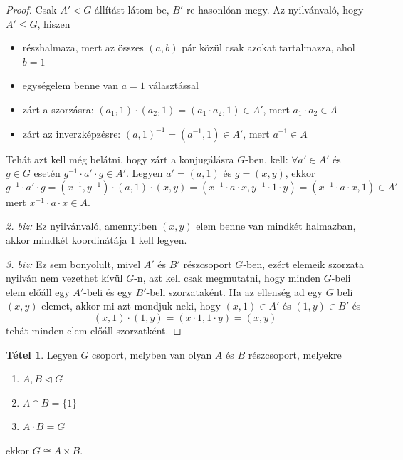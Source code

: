 \documentclass[12pt]{book}
\theoremstyle{plain} %
\theoremstyle{definition} %
\newtheorem{theo/}{Tétel}[section]
\newenvironment{theo}
  {\renewcommand{\qedsymbol}{$\clubsuit$}%
   \pushQED{\qed}\begin{theo/}}
  {\popQED\end{theo/}}
\theoremstyle{remark}
\renewcommand\qedsymbol{$\blacksquare$}
\numberwithin{equation}{section}  %
\begin{document}
	\begin{proof}
		Csak $A' \triangleleft G$ állítást látom be, $B'$-re hasonlóan megy. Az nyilvánvaló, hogy $A'\leq G$, hiszen
		\begin{itemize}
			\item{részhalmaza, mert az összes $(a,b)$ pár közül csak azokat tartalmazza, ahol $b=1$}
			\item{egységelem benne van $a=1$ választással}
			\item{zárt a szorzásra: $(a_1,1)\cdot (a_2,1)=(a_1\cdot a_2,1)\in A'$, mert $a_1\cdot a_2 \in A$}
			\item{zárt az inverzképzésre: $(a,1)^{-1}=(a^{-1},1)\in A'$, mert $a^{-1}\in A$}
		\end{itemize}
		Tehát azt kell még belátni, hogy zárt a konjugálásra $G$-ben, kell: $\forall a'\in A'$ és $g\in G$ esetén $g^{-1} \cdot a' \cdot g \in A'$. Legyen $a'=(a,1)$ és $g=(x,y)$, ekkor
		\[ g^{-1} \cdot a' \cdot g = (x^{-1},y^{-1})\cdot (a,1)\cdot (x,y) = (x^{-1}\cdot a \cdot x, y^{-1}\cdot 1 \cdot y) = (x^{-1}\cdot a\cdot x,1)\in A' \] 
		mert $x^{-1}\cdot a\cdot x \in A$.
		
		\textit{2. biz: }Ez nyilvánvaló, amennyiben $(x,y)$ elem benne van mindkét halmazban, akkor mindkét koordinátája $1$ kell legyen.
		
		\textit{3. biz: }
		Ez sem bonyolult, mivel $A'$ és $B'$ részcsoport $G$-ben, ezért elemeik szorzata nyilván nem vezethet kívül $G$-n, azt kell csak megmutatni, hogy minden $G$-beli elem előáll egy $A'$-beli és egy $B'$-beli szorzataként. Ha az ellenség ad egy $G$ beli $(x,y)$ elemet, akkor mi azt mondjuk neki, hogy $(x,1)\in A'$ és $(1,y)\in B'$ és
		\[ (x,1)\cdot (1,y) = (x\cdot 1,1\cdot y) = (x,y) \]
		tehát minden elem előáll szorzatként.
	\end{proof}

	\begin{theo}
		Legyen $G$ csoport, melyben van olyan $A$ és $B$ részcsoport, melyekre
		\begin{enumerate}
			\item{$A,B\triangleleft G$}
			\item{$A\cap B= \{1\}$}
			\item{$A\cdot B = G$}
		\end{enumerate}
		ekkor $G\cong A\times B$.
	\end{theo}
\end{document}
